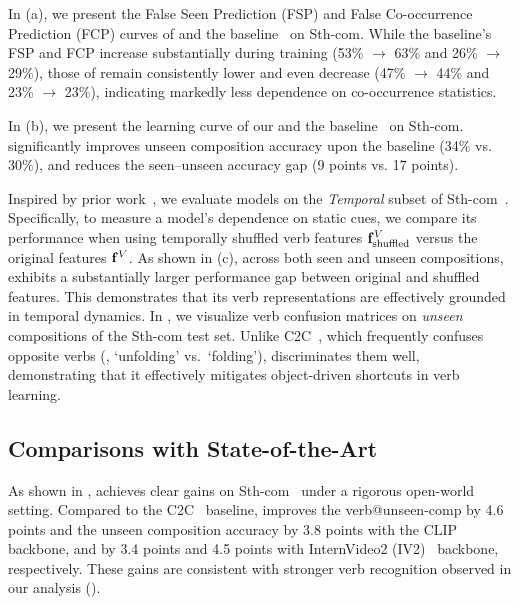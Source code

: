 
In  (a), we present the False Seen Prediction (FSP) and False Co-occurrence Prediction (FCP) curves of \ours{} and the baseline~\cite{li2024c2c} on Sth-com. 
While the baseline’s FSP and FCP increase substantially during training (53\% $\rightarrow$ 63\% and 26\% $\rightarrow$ 29\%), those of \ours{} remain consistently lower and even decrease (47\% $\rightarrow$ 44\% and 23\% $\rightarrow$ 23\%), indicating markedly less dependence on co-occurrence statistics.

In  (b), we present the learning curve of our \ours{} and the baseline~\cite{li2024c2c} on Sth-com. 
\ours{} significantly improves unseen composition accuracy upon the baseline (34\% vs. 30\%), and reduces the seen--unseen accuracy gap (9 points vs. 17 points).









Inspired by prior work~\cite{yun2022time}, we evaluate models on the \emph{Temporal} subset of Sth-com~\cite{li2024c2c}.
Specifically, to measure a model’s dependence on static cues, we compare its performance when using temporally shuffled verb features $\mathbf{f}^V_{\text{shuffled}}$ versus the original features $\mathbf{f}^V$.
As shown in  (c), across both seen and unseen compositions, \ours{} exhibits a substantially larger performance gap between original and shuffled features. 
This demonstrates that its verb representations are effectively grounded in temporal dynamics.
In , we visualize verb confusion matrices on \emph{unseen} compositions of the Sth-com test set.
Unlike C2C~\cite{li2024c2c}, which frequently confuses opposite verbs (\eg, `unfolding' vs.\ `folding'), \ours{} discriminates them well, demonstrating that it effectively mitigates object-driven shortcuts in verb learning.








\subsection{Comparisons with State-of-the-Art}
\label{sec:main_results}


 As shown in , \ours{} achieves clear gains on Sth-com~\cite{li2024c2c} under a rigorous open-world setting. 
Compared to the C2C~\cite{li2024c2c} baseline, \ours{} improves the verb@unseen-comp by 4.6 points and the unseen composition accuracy by 3.8 points with the CLIP~\cite{radford2021clip} backbone, and by 3.4 points and 4.5 points with InternVideo2 (IV2)~\cite{wang2024iv2} backbone, respectively.
These gains are consistent with stronger verb recognition observed in our analysis ().
\vspace{-1.2em}
 

